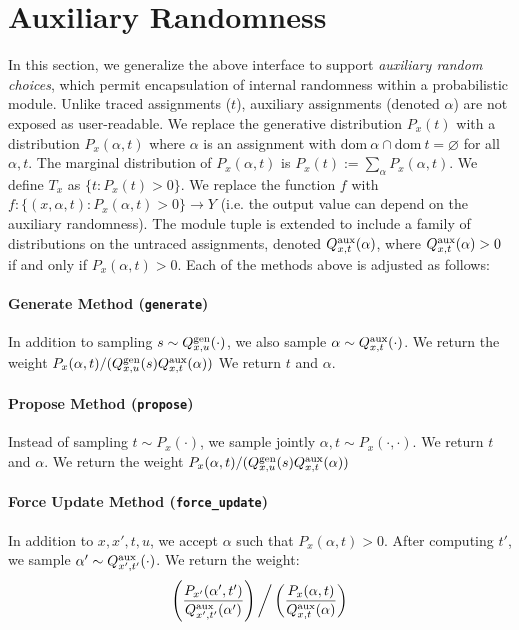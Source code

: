 \documentclass{article}
\newcommand{\code}[1]{\texttt{\small{\textbf{#1}}}}
\newcommand{\dom}[1]{\mbox{dom}{~#1}}
\newcommand{\gen}[0]{\mbox{\scriptsize gen}}
\newcommand{\auxassign}[0]{\alpha}
\newcommand{\aux}[0]{\mbox{\scriptsize aux}}
\begin{document}
\section{Auxiliary Randomness}
In this section, we generalize the above interface to support \emph{auxiliary random choices}, which permit encapsulation of internal randomness within a probabilistic module.
Unlike traced assignments ($t$), auxiliary assignments (denoted $\auxassign$) are not exposed as user-readable.
We replace the generative distribution $P_x(t)$ with a distribution $P_x(\auxassign, t)$ where $\auxassign$ is an assignment with $\dom{\auxassign} \cap \dom{t} = \varnothing$ for all $\auxassign, t$.
The marginal distribution of $P_x(\auxassign, t)$ is $P_x(t) := \sum_{\auxassign} P_x(\auxassign, t)$.
We define $T_x$ as $\{t : P_x(t) > 0\}$.
We replace the function $f$ with $f : \{(x, \auxassign, t) : P_x(\auxassign, t) > 0 \} \to Y$ (i.e. the output value can depend on the auxiliary randomness).
The module tuple is extended to include a family of distributions on the untraced assignments, denoted $Q^{\aux}_{x,t}(\auxassign)$, where $Q^{\aux}_{x,t}(\auxassign) > 0$ if and only if $P_x(\auxassign, t) > 0$.
Each of the methods above is adjusted as follows:

\paragraph{Generate Method (\code{generate})}
In addition to sampling $s \sim Q^{\gen}_{x,u}(\cdot)$, we also sample $\auxassign \sim Q^{\aux}_{x,t}(\cdot)$.
We return the weight $P_x(\auxassign, t) / (Q^{\gen}_{x,u}(s) Q^{\aux}_{x,t}(\auxassign))$
We return $t$ and $\auxassign$.

\paragraph{Propose Method (\code{propose})}
Instead of sampling $t \sim P_x(\cdot)$, we sample jointly $\auxassign, t \sim P_x(\cdot, \cdot)$.
We return $t$ and $\auxassign$.
We return the weight $P_x(\auxassign, t) / (Q^{\gen}_{x,u}(s) Q^{\aux}_{x,t}(\auxassign))$

\paragraph{Force Update Method (\code{force\_update})}
In addition to $x, x', t, u$, we accept $\auxassign$ such that $P_x(\auxassign, t) > 0$.
After computing $t'$, we sample $\auxassign' \sim Q^{\aux}_{x',t'}(\cdot)$.
We return the weight:
\[
\left( \frac{P_{x'}(\auxassign', t')}{Q^{\aux}_{x',t'}(\auxassign')} \right)
\bigg/
\left( \frac{P_x(\auxassign, t)}{Q^{\aux}_{x,t}(\auxassign)} \right)
\]
\end{document}
